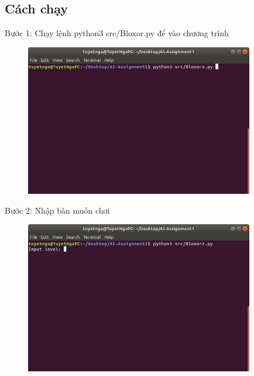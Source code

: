\documentclass[a4paper]{article}
\begin{document}
\subsection{Cách chạy} 
\begin{flushleft}
	\hspace{2 cm}	Bước 1: Chạy lệnh python3 src/Bloxor.py để vào chương trình
\end{flushleft}
\begin{center}
	\begin{figure}[htp]
		\begin{center}
			\includegraphics[width=10cm]{Images/depth1.png}
		\end{center}
		\caption{\label{fig:depth1}}
	\end{figure}
\end{center}
\begin{flushleft}
	\hspace{2 cm} Bước 2: Nhập bàn muốn chơi
\end{flushleft}
\begin{center}
	\begin{figure}[htp]
		\begin{center}
			\includegraphics[width=10cm]{Images/depth2.png}
		\end{center}
		\caption{\label{fig:depth2}}
	\end{figure}
\end{center}
\end{document}
